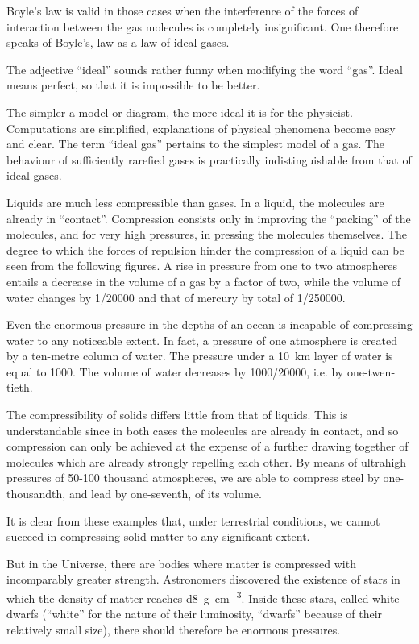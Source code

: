 Boyle’s law is valid in those cases when the inter­ference of the forces of interaction between the gas mole­cules is completely insignificant. One therefore speaks of Boyle’s, law as a law of ideal gases.

The adjective ``ideal'' sounds rather funny when modi­fying the word ``gas''. Ideal means perfect, so that it is impossible to be better. 

The simpler a model or diagram, the more ideal it is for the physicist. Computations are simplified, explana­tions of physical phenomena become easy and clear. The term ``ideal gas'' pertains to the simplest model of a gas. The behaviour of sufficiently rarefied gases is practically indistinguishable from that of ideal gases.

Liquids are much less compressible than gases. In a liquid, the molecules are already in ``contact''. Compres­sion consists only in improving the ``packing'' of the molecules, and for very high pressures, in pressing the molecules themselves. The degree to which the forces of repulsion hinder the compression of a liquid can be seen from the following figures. A rise in pressure from one to two atmospheres entails a decrease in the volume of a gas by a factor of two, while the volume of water changes by 1/\num{20000} and that of mercury by total of 1/\num{250000}.

Even the enormous pressure in the depths of an ocean is incapable of compressing water to any noticeable extent. In fact, a pressure of one atmosphere is created by a ten-metre column of water. The pressure under a \SI{10}{\kilo\meter} layer of water is equal to \SI{1000}{\atmos}. The volume of water decreases by 1000/\num{20000}, i.e. by one-twen­tieth.

The compressibility of solids differs little from that of liquids. This is understandable since in both cases the molecules are already in contact, and so compression can only be achieved at the expense of a further drawing together of molecules which are already strongly repelling each other. By means of ultrahigh pressures of 50-100 thou­sand atmospheres, we are able to compress steel by one-thousandth, and lead by one-seventh, of its volume.

It is clear from these examples that, under terrestrial conditions, we cannot succeed in compressing solid mat­ter to any significant extent.

But in the Universe, there are bodies where matter is compressed with incomparably greater strength. Astron­omers discovered the existence of stars in which the density of matter reaches \SI{d8}{\gram\per\centi\meter\cubed}. Inside these stars, called white dwarfs (``white'' for the nature of their lumi­nosity, ``dwarfs'' because of their relatively small size), there should therefore be enormous pressures.


